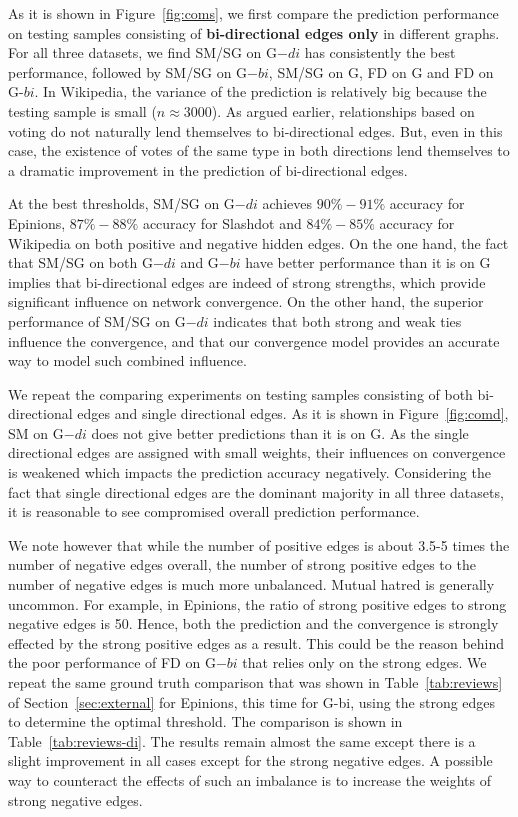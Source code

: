 \documentclass[acmtweb]{acmsmall}
\begin{document}
As it is shown in Figure~\ref{fig:coms}, we first compare the
prediction performance on testing samples consisting of {\bf
  bi-directional edges only} in different graphs.  For all three
datasets, we find SM/SG on G$-di$ has consistently the best
performance, followed by SM/SG on G$-bi$, SM/SG on G, FD on G and FD
on G-$bi$. In Wikipedia, the variance of the prediction is relatively
big because the testing sample is small ($n \approx 3000$). As argued
earlier, relationships based on voting do not naturally lend
themselves to bi-directional edges. But, even in this case, the
existence of votes of the same type in both directions lend themselves
to a dramatic improvement in the prediction of bi-directional edges.

At the best thresholds, SM/SG on G$-di$ achieves $90\%-91 \%$ accuracy
for Epinions, $87\%-88 \%$ accuracy for Slashdot and $84\%-85 \%$
accuracy for Wikipedia on both positive and negative hidden edges. On
the one hand, the fact that SM/SG on both G$-di$ and G$-bi$ have
better performance than it is on G implies that bi-directional edges
are indeed of strong strengths, which provide significant influence on
network convergence. On the other hand, the superior performance of
SM/SG on G$-di$ indicates that both strong and weak ties influence the
convergence, and that our convergence model provides an accurate way
to model such combined influence.

We repeat the comparing experiments on testing samples consisting of
both bi-directional edges and single directional edges. As it is shown
in Figure~\ref{fig:comd}, SM on G$-di$ does not give better
predictions than it is on G. As the single directional edges are
assigned with small weights, their influences on convergence is
weakened which impacts the prediction accuracy negatively. Considering
the fact that single directional edges are the dominant majority in
all three datasets, it is reasonable to see compromised overall
prediction performance.

We note however that while the number of positive edges is about 3.5-5
times the number of negative edges overall, the number of strong
positive edges to the number of negative edges is much more
unbalanced. Mutual hatred is generally uncommon. For example, in
Epinions, the ratio of strong positive edges to strong negative edges
is 50. Hence, both the prediction and the convergence is strongly
effected by the strong positive edges as a result. This could be the
reason behind the poor performance of FD on G$-bi$ that relies only on
the strong edges. We repeat the same ground truth comparison that was
shown in Table~\ref{tab:reviews} of Section~\ref{sec:external} for
Epinions, this time for G-bi, using the strong edges to determine the
optimal threshold. The comparison is shown in
Table~\ref{tab:reviews-di}. The results remain almost the same except
there is a slight improvement in all cases except for the strong
negative edges. A possible way to counteract the effects of such an
imbalance is to increase the weights of strong negative edges.
\end{document}
